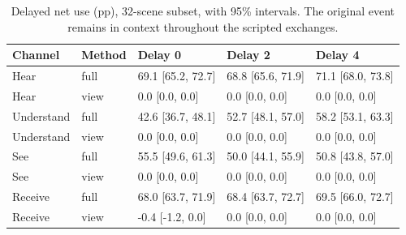 \documentclass[11pt]{article}
\begin{document}
\begin{table}[!tp]
\centering\setlength{\tabcolsep}{4.5pt}\small
\begin{lrbox}{\OCtable}\begin{tabular*}{\linewidth}{@{\extracolsep{\fill}}lllll@{}}
\toprule
\textbf{Channel} & \textbf{Method} & \textbf{Delay 0} & \textbf{Delay 2} & \textbf{Delay 4}\\
\midrule
Hear & full & 69.1 [65.2, 72.7] & 68.8 [65.6, 71.9] & 71.1 [68.0, 73.8]\\
Hear & view & 0.0 [0.0, 0.0] & 0.0 [0.0, 0.0] & 0.0 [0.0, 0.0]\\
Understand & full & 42.6 [36.7, 48.1] & 52.7 [48.1, 57.0] & 58.2 [53.1, 63.3]\\
Understand & view & 0.0 [0.0, 0.0] & 0.0 [0.0, 0.0] & 0.0 [0.0, 0.0]\\
See & full & 55.5 [49.6, 61.3] & 50.0 [44.1, 55.9] & 50.8 [43.8, 57.0]\\
See & view & 0.0 [0.0, 0.0] & 0.0 [0.0, 0.0] & 0.0 [0.0, 0.0]\\
Receive & full & 68.0 [63.7, 71.9] & 68.4 [63.7, 72.7] & 69.5 [66.0, 72.7]\\
Receive & view & -0.4 [-1.2, 0.0] & 0.0 [0.0, 0.0] & 0.0 [0.0, 0.0]\\
\bottomrule
\end{tabular*}\end{lrbox}
\ifdim\wd\OCtable>\linewidth\PackageError{access-paper}{Table tab:delay exceeds its column}{Revise the table layout.}\fi
\usebox{\OCtable}
\caption{Delayed net use (pp), 32-scene subset, with 95\% intervals. The original event remains in context throughout the scripted exchanges.}
\label{tab:delay}
\end{table}
\end{document}
